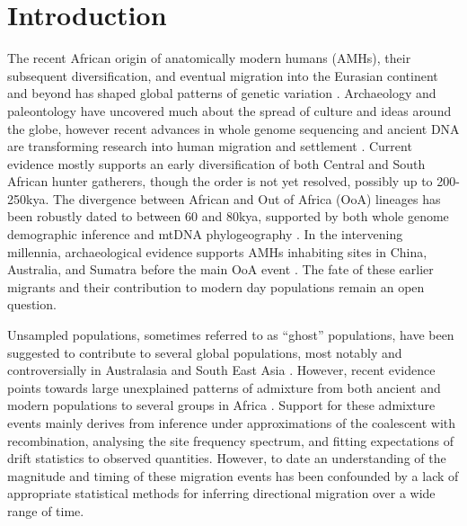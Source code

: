 \documentclass{article}
\begin{document}
\section{Introduction}
The recent African origin of anatomically modern humans (AMHs), their subsequent diversification, and eventual migration into the Eurasian continent and beyond has shaped global patterns of genetic variation \cite{Pagani2016, Nielsen2017a}. Archaeology and paleontology have uncovered much about the spread of culture and ideas around the globe, however recent advances in whole genome sequencing and ancient DNA are transforming research into human migration and settlement \cite{Skoglund2018}. Current evidence mostly supports an early diversification of both Central and South African hunter gatherers, though the order is not yet resolved, possibly up to 200-250kya. \cite{Lipson2019,Schlebusch2017, Skoglund2017} The divergence between African and Out of Africa (OoA) lineages has been robustly dated to between 60 and 80kya, supported by both whole genome demographic inference and mtDNA phylogeography \cite{Lipson2019,Soares2012}. In the intervening millennia, archaeological evidence supports AMHs inhabiting sites in China, Australia, and Sumatra before the main OoA event \cite{Clarkson2017, Liu2015, Westaway2017}. The fate of these earlier migrants and their contribution to modern day populations remain an open question. 

Unsampled populations, sometimes referred to as ``ghost'' populations, have been suggested to contribute to several global populations, most notably and controversially in Australasia and South East Asia \cite{Malaspinas2016, Mallick2016, Pagani2016, Rasmussen2011, Skoglund2015}. However, recent evidence points towards large unexplained patterns of admixture from both ancient and modern populations to several groups in Africa \cite{Durvasula2019, Lipson2019, Skoglund2017, Hammer2011, Plagnol2006, Ragsdale2019}. Support for these admixture events mainly derives from inference under approximations of the coalescent with recombination, analysing the site frequency spectrum, and fitting expectations of drift statistics to observed quantities. However, to date an understanding of the magnitude and timing of these migration events has been confounded by a lack of appropriate statistical methods for inferring directional migration over a wide range of time. 
\end{document}
